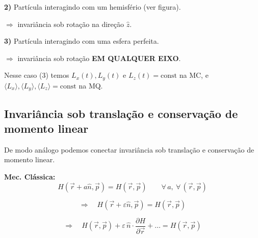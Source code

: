 \textbf{2)} Partícula interagindo com um hemisfério (ver figura).
\begin{center}
\end{center}
$\Rightarrow$ invariância sob rotação na direção $\hat{z}$.

\textbf{3)} Partícula interagindo com uma esfera perfeita.
\begin{center}
\end{center}
$\Rightarrow$ invariância sob rotação \textbf{EM QUALQUER EIXO}.

Nesse caso (3) temos $L_x(t), L_y(t)$ e $L_z(t) = \text{const}$ na MC, e $\langle L_x\rangle, \langle L_y\rangle, \langle L_z\rangle = \text{const}$ na MQ.

\subsection*{Invariância sob translação e conservação de momento linear}

De modo análogo podemos conectar invariância sob translação e conservação de momento linear.

\textbf{Mec. Clássica:}
\begin{equation}
    H(\vec{r}+a\hat{n}, \vec{p}) = H(\vec{r},\vec{p}) \qquad \forall\,a,\ \forall\,(\vec{r},\vec{p})
\label{eq:aula21_transl_mc_1}
\end{equation}

\begin{equation}
    \Longrightarrow \quad H(\vec{r}+\varepsilon\hat{n}, \vec{p}) = H(\vec{r},\vec{p})
\label{eq:aula21_transl_mc_2}
\end{equation}

\begin{equation}
    \Longrightarrow \quad H(\vec{r},\vec{p}) + \varepsilon\,\hat{n}\cdot\frac{\partial H}{\partial \vec{r}} + \dots = H(\vec{r},\vec{p})
\label{eq:aula21_transl_mc_3}
\end{equation}

